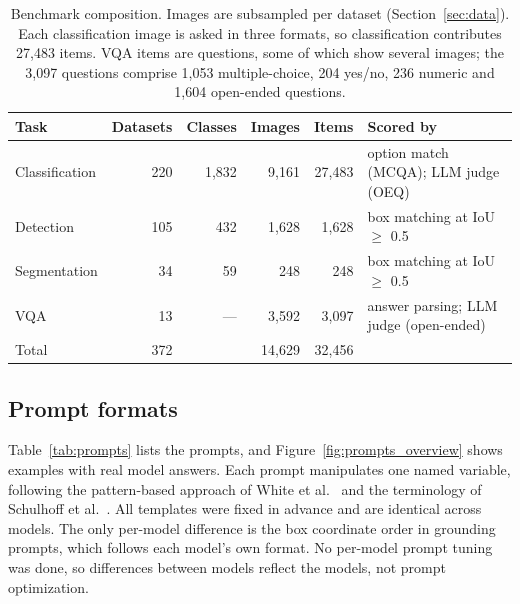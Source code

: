 \documentclass[10pt,letterpaper]{article}
\newcommand{\tablefont}{\footnotesize}
\begin{document}
\begin{table}[!tbp]
\centering
\caption{Benchmark composition. Images are subsampled per dataset (Section~\ref{sec:data}). Each classification image is asked in three formats, so classification contributes 27,483 items. VQA items are questions, some of which show several images; the 3,097 questions comprise 1,053 multiple-choice, 204 yes/no, 236 numeric and 1,604 open-ended questions.}
\label{tab:data}
\renewcommand{\arraystretch}{1.15}
\tablefont
\begin{tabular}{lrrrrl}
\toprule
\textbf{Task} & \textbf{Datasets} & \textbf{Classes} & \textbf{Images} & \textbf{Items} & \textbf{Scored by} \\
\midrule
Classification & 220 & 1,832 & 9,161 & 27,483 & option match (MCQA); LLM judge (OEQ) \\
Detection & 105 & 432 & 1,628 & 1,628 & box matching at IoU $\geq$ 0.5 \\
Segmentation & 34 & 59 & 248 & 248 & box matching at IoU $\geq$ 0.5 \\
VQA & 13 & --- & 3,592 & 3,097 & answer parsing; LLM judge (open-ended) \\
\midrule
Total & 372 & & 14,629 & 32,456 & \\
\bottomrule
\end{tabular}
\end{table}

\subsection{Prompt formats}
\label{sec:prompt_methodology}
Table~\ref{tab:prompts} lists the prompts, and Figure~\ref{fig:prompts_overview} shows examples with real model answers. Each prompt manipulates one named variable, following the pattern-based approach of White et al.\ \cite{white_prompt_2023} and the terminology of Schulhoff et al.\ \cite{schulhoff_prompt_2024}. All templates were fixed in advance and are identical across models. The only per-model difference is the box coordinate order in grounding prompts, which follows each model's own format. No per-model prompt tuning was done, so differences between models reflect the models, not prompt optimization.
\end{document}
